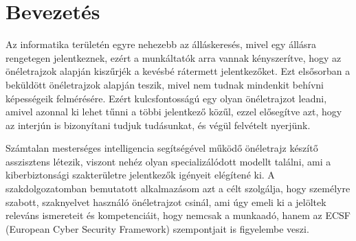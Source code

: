 \chapter{Bevezetés}
\label{ch:intro}

Az informatika területén egyre nehezebb az álláskeresés, mivel egy állásra rengetegen jelentkeznek, ezért a munkáltatók arra vannak kényszerítve, hogy az önéletrajzok alapján kiszűrjék a kevésbé rátermett jelentkezőket. Ezt elsősorban a beküldött önéletrajzok alapján teszik, mivel nem tudnak mindenkit behívni képességeik felmérésére. Ezért kulcsfontosságú egy olyan önéletrajzot leadni, amivel azonnal ki lehet tűnni a többi jelentkező közűl, ezzel elősegítve azt, hogy az interjún is bizonyítani tudjuk tudásunkat, és végül felvételt nyerjünk.

Számtalan mesterséges intelligencia segítségével működő önéletrajz készítő asszisztens létezik, viszont nehéz olyan specializálódott modellt találni, ami a kiberbiztonsági szakterületre jelentkezők igényeit elégítené ki. A szakdolgozatomban bemutatott alkalmazásom azt a célt szolgálja, hogy személyre szabott, szaknyelvet használó önéletrajzot csinál, ami úgy emeli ki a jelöltek releváns ismereteit és kompetenciáit, hogy nemcsak a munkaadó, hanem az ECSF (European Cyber Security Framework) szempontjait is figyelembe veszi.
